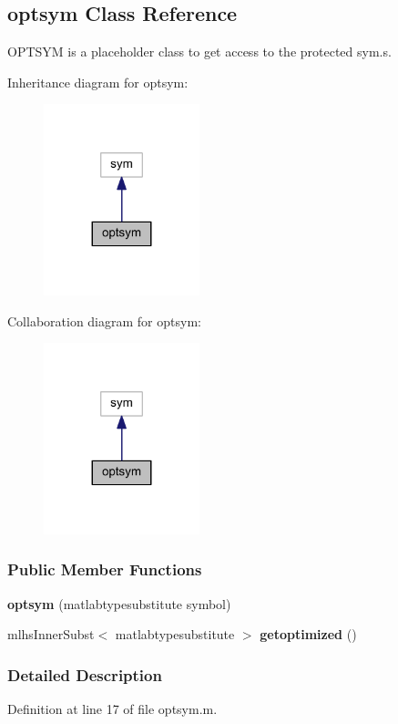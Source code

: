 \hypertarget{classoptsym}{}\subsection{optsym Class Reference}
\label{classoptsym}


O\+P\+T\+S\+Y\+M is a placeholder class to get access to the protected sym.\+s.  




Inheritance diagram for optsym\+:\nopagebreak
\begin{figure}[H]
\begin{center}
\leavevmode
\includegraphics[width=128pt]{classoptsym__inherit__graph}
\end{center}
\end{figure}


Collaboration diagram for optsym\+:\nopagebreak
\begin{figure}[H]
\begin{center}
\leavevmode
\includegraphics[width=128pt]{classoptsym__coll__graph}
\end{center}
\end{figure}
\subsubsection*{Public Member Functions}
\begin{DoxyCompactItemize}
\item 
\hypertarget{classoptsym_aea5ddc9b81eaa00597d9705e74bc5e41}{}{\bfseries optsym} (matlabtypesubstitute symbol)\label{classoptsym_aea5ddc9b81eaa00597d9705e74bc5e41}

\item 
\hypertarget{classoptsym_ae3e46f44f77b6a05a46950c431cb1664}{}mlhs\+Inner\+Subst$<$ matlabtypesubstitute $>$ {\bfseries getoptimized} ()\label{classoptsym_ae3e46f44f77b6a05a46950c431cb1664}

\end{DoxyCompactItemize}


\subsubsection{Detailed Description}


Definition at line 17 of file optsym.\+m.

